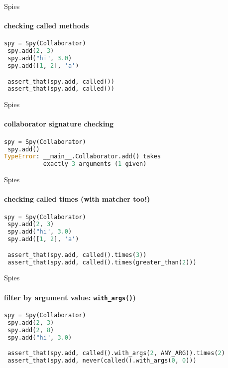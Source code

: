 \documentclass[11pt]{beamer}
\begin{document}
\begin{frame}[fragile]{Spies}
\framesubtitle{checking called methods}

\begin{exampleblock}{}
\begin{lstlisting}[language=Python]
 spy = Spy(Collaborator)
 spy.add(2, 3)
 spy.add("hi", 3.0)
 spy.add([1, 2], 'a')

 assert_that(spy.add, called())
 assert_that(spy.add, called())
\end{lstlisting}
\end{exampleblock}

\end{frame}

\begin{frame}[fragile]{Spies}
\framesubtitle{collaborator signature checking}

\begin{exampleblock}{}
\begin{lstlisting}[language=Python]
 spy = Spy(Collaborator)
 spy.add()
TypeError: __main__.Collaborator.add() takes
           exactly 3 arguments (1 given)
\end{lstlisting}
\end{exampleblock}

\end{frame}

\begin{frame}[fragile]{Spies}
\framesubtitle{checking called times (with matcher too!)}

\begin{exampleblock}{}
\begin{lstlisting}[language=Python]
 spy = Spy(Collaborator)
 spy.add(2, 3)
 spy.add("hi", 3.0)
 spy.add([1, 2], 'a')

 assert_that(spy.add, called().times(3))
 assert_that(spy.add, called().times(greater_than(2)))
\end{lstlisting}
\end{exampleblock}

\end{frame}

\begin{frame}[fragile]{Spies}
\framesubtitle{filter by argument value: \texttt{with\_args()})}

\begin{exampleblock}{}
\begin{lstlisting}[language=Python]
 spy = Spy(Collaborator)
 spy.add(2, 3)
 spy.add(2, 8)
 spy.add("hi", 3.0)

 assert_that(spy.add, called().with_args(2, ANY_ARG)).times(2)
 assert_that(spy.add, never(called().with_args(0, 0)))
\end{lstlisting}
\end{exampleblock}
\end{frame}
\end{document}
